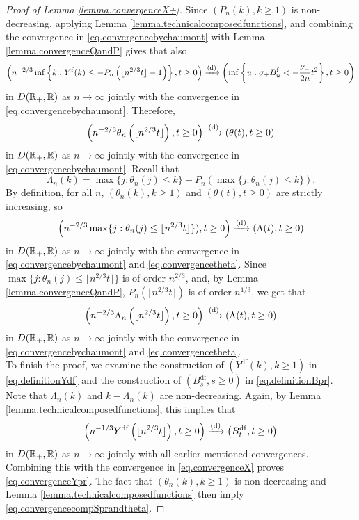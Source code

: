 \begin{proof}[Proof of Lemma \ref{lemma.convergenceX+}]
Since $(P_n(k),k\geq 1)$ is non-decreasing, applying Lemma \ref{lemma.technicalcomposedfunctions}, and combining the convergence in \cref{eq.convergencebychaumont} with Lemma \ref{lemma.convergenceQandP} gives that also
$$\left(n^{-2/3}\inf\left\{k:Y^{\mathrm{f}}(k) \leq - P_n\left(\lfloor n^{2/3} t \rfloor -1\right)\right\},t\geq 0\right)\xrightarrow[]{\mathrm{(d)}}\left(\inf\left\{u:\sigma_+ B^{\mathrm{f}}_u< -\frac{\nu_-}{2\mu} t^2\right\},t\geq 0\right)$$
  in $D({\mathbb R}_+,{\mathbb R})$ as $n\to \infty$ jointly with the convergence in \cref{eq.convergencebychaumont}. Therefore, 
 \begin{equation}\label{eq.convergencetheta}\left(n^{-2/3}\theta_n\left(\lfloor n^{2/3}t\rfloor \right),t\geq 0 \right) \xrightarrow[]{\mathrm{(d)}} \left(\theta(t),t\geq 0\right)\end{equation}
  in $D({\mathbb R}_+,{\mathbb R})$ as $n\to \infty$ jointly with the convergence in \cref{eq.convergencebychaumont}.
Recall that 
$$\Lambda_n(k)=\max\{j:\theta_n(j)\leq k\}-P_n(\max\{j:\theta_n(j)\leq k\}). $$ By definition, for all $n$, $(\theta_n(k),k\geq 1)$ and $(\theta(t),t\geq 0)$ are strictly increasing, so
$$\left(n^{-2/3}\max\{j:\theta_n(j)\leq \lfloor n^{2/3} t \rfloor\} ),t\geq 0\right)\xrightarrow[]{\mathrm{(d)}}\left( \Lambda(t),t\geq0 \right)$$
in $D({\mathbb R}_+,{\mathbb R})$ as $n\to \infty$ jointly with the convergence in \cref{eq.convergencebychaumont} and \cref{eq.convergencetheta}. Since $\max\{j:\theta_n(j)\leq \lfloor n^{2/3} t \rfloor\}$ is of order $n^{2/3}$, and, by Lemma \ref{lemma.convergenceQandP}, $P_n(\lfloor n^{2/3}t\rfloor)$ is of order $n^{1/3}$, we get that 
$$\left(n^{-2/3}\Lambda_n\left(\lfloor n^{2/3} t \rfloor \right),t\geq 0\right)\xrightarrow[]{\mathrm{(d)}}\left( \Lambda(t),t\geq0 \right)$$
in $D({\mathbb R}_+,{\mathbb R})$ as $n\to \infty$ jointly with the convergence in \cref{eq.convergencebychaumont} and \cref{eq.convergencetheta}.\\
To finish the proof, we examine the construction of $(Y^{\mathrm{df}}(k),k\geq 1)$ in \cref{eq.definitionYdf} and the construction of $(B^{\mathrm{df}}_s,s\geq 0)$ in \cref{eq.definitionBpr}. 
Note that $\Lambda_n(k)$ and $k-\Lambda_n(k)$ are non-decreasing. Again, by Lemma \ref{lemma.technicalcomposedfunctions}, this implies that 
$$\left(n^{-1/3}Y^{\mathrm{df}}\left( \lfloor n^{2/3} t \rfloor \right), t\geq 0 \right)\xrightarrow[]{\mathrm{(d)}} \left( B^{\mathrm{df}}_{t}, t\geq 0\right)$$
in $D({\mathbb R}_+,{\mathbb R})$ as $n\to \infty$ jointly with all earlier mentioned convergences. Combining this with the convergence in \cref{eq.convergenceX} proves \cref{eq.convergenceYpr}. The fact that $(\theta_n(k),k\geq 1)$ is non-decreasing and Lemma \ref{lemma.technicalcomposedfunctions} then imply \cref{eq.convergencecompSprandtheta}. 
\end{proof}

